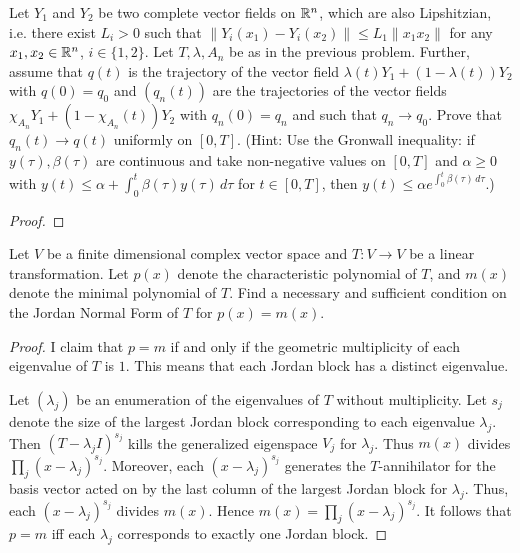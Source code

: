 \documentclass{article}
\begin{document}
 Let $Y_1$ and $Y_2$ be two complete vector fields on $\mathbb{R}^n$, which are also Lipshitzian, i.e. there exist $L_i > 0$ such that $\|Y_i(x_1) - Y_i(x_2)\| \le L_1 \|x_1 x_2 \|$ for any $x_1, x_2 \in \mathbb{R}^n$, $i \in \{1, 2\}$. Let $T, \lambda, A_n$ be as in the previous problem. Further, assume that $q(t)$ is the trajectory of the vector field $\lambda(t)Y_1 + (1 - \lambda(t)) Y_2$ with $q(0) = q_0$ and $(q_n(t))$ are the trajectories of the vector fields $\chi_{A_n} Y_1 + (1 - \chi_{A_n}(t))Y_2$ with $q_n(0) = q_n$ and such that $q_n \to q_0$. Prove that $q_n(t) \to q(t)$ uniformly on $[0,T]$.
(Hint: Use the Gronwall inequality: if $y(\tau), \beta(\tau)$ are continuous and take non-negative values on $[0,T]$ and $\alpha \ge 0$ with $y(t) \le \alpha + \int_0^t \beta(\tau) y(\tau) \, d\tau$ for $t \in [0,T]$, then $y(t) \le \alpha e^{\int_0^t \beta(\tau) \, d \tau}$.)


\begin{proof}
\end{proof}


 Let $V$ be a finite dimensional complex vector space and $T:V \to V$ be a linear transformation. Let $p(x)$ denote the characteristic polynomial of $T$, and $m(x)$ denote the minimal polynomial of $T$. Find a necessary and sufficient condition on the Jordan Normal Form of $T$ for $p(x) = m(x)$.
\begin{proof}
I claim that $p = m$ if and only if the geometric multiplicity of each eigenvalue of $T$ is $1$. This means that each Jordan block has a distinct eigenvalue.

Let $(\lambda_j)$ be an enumeration of the eigenvalues of $T$ without multiplicity. Let $s_j$ denote the size of the largest Jordan block corresponding to each eigenvalue $\lambda_j$. Then $(T - \lambda_j I)^{s_j}$ kills the generalized eigenspace $V_j$ for $\lambda_j$.   Thus $m(x)$ divides $\prod_j (x - \lambda_j)^{s_j}$.   Moreover, each $(x - \lambda_j)^{s_j}$ generates the $T$-annihilator for the basis vector acted on by the last column of the largest Jordan block for $\lambda_j$.   Thus, each $(x - \lambda_j)^{s_j}$ divides $m(x)$.  Hence $m(x) = \prod_j (x - \lambda_j)^{s_j}$.  It follows that $p = m$ iff each $\lambda_j$ corresponds to exactly one Jordan block.
\end{proof}
\end{document}
